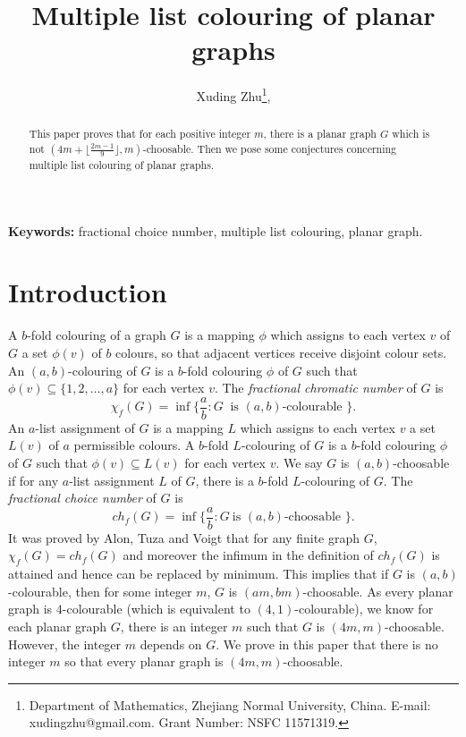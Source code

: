 \documentclass[12pt]{article}
\begin{document}
\newcommand{\qed}{\hfill\rule{0.5em}{0.809em}}

\newcommand{\var}{\vartriangle}


\title{{\large \bf Multiple list colouring of  planar graphs}}


\author{   Xuding Zhu\thanks{Department of Mathematics, Zhejiang Normal University,  China.  E-mail: xudingzhu@gmail.com. Grant Number: NSFC 11571319.},}

\date{}
\maketitle

\begin{abstract}
This paper proves that for each positive integer $m$, there is a planar graph $G$ which is not $(4m+\lfloor \frac{2m-1}{9}\rfloor,m)$-choosable. Then we pose some conjectures concerning multiple list colouring of planar graphs.  
\end{abstract}

\vspace{3mm}\textbf{Keywords:} fractional choice number,  multiple list colouring,  planar graph.


\section{Introduction}

A $b$-fold colouring of a graph $G$ is a mapping $\phi$ which assigns to each vertex $v$ of $G$ a set $\phi(v)$ of $b$ colours, so that adjacent vertices receive disjoint colour sets. An $(a,b)$-colouring of $G$ is a $b$-fold colouring $\phi$ of $G$ such that $\phi(v) \subseteq \{1,2,\ldots, a\}$ for each vertex $v$. The {\em fractional chromatic number} of $G$ is
 $$\chi_f(G)= \inf\{\frac ab: G \ \text{ is $(a,b)$-colourable } \}.$$
An $a$-list assignment of $G$ is a mapping $L$ which assigns to each vertex $v$ a set $L(v)$ of $a$ permissible colours. A $b$-fold $L$-colouring of $G$ is a $b$-fold colouring $\phi$ of $G$ such that $\phi(v) \subseteq L(v)$ for each vertex $v$. We say $G$ is $(a,b)$-choosable if for any $a$-list assignment $L$ of $G$, there is a $b$-fold $L$-colouring of $G$. The {\em fractional choice number} of $G$ is $$ch_f(G)= \inf\{\frac ab:  G \ \text{is $(a,b)$-choosable }\}.$$ It was proved by Alon, Tuza and Voigt \cite{ATV1995} that for any finite graph $G$, $\chi_f(G)=ch_f(G)$ and moreover the infimum in the definition of $ch_f(G)$ is attained and hence can be replaced by minimum. This implies that if $G$ is $(a,b)$-colourable, then for some integer $m$, $G$ is $(am,bm)$-choosable. As every planar graph is $4$-colourable (which is equivalent to $(4,1)$-colourable), we know for each planar graph $G$, there is an integer $m$ such that $G$ is $(4m,m)$-choosable. However, the integer $m$ depends on $G$. 
We prove in this paper that there is no integer $m$ so that every planar graph is $(4m,m)$-choosable.   
\end{document}
